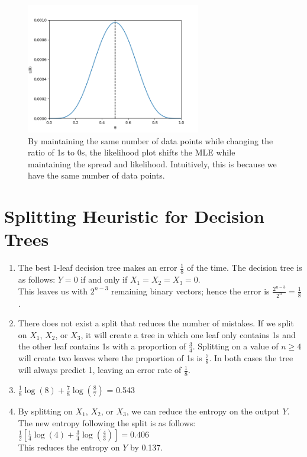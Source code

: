 \documentclass[11pt]{article}
\newcommand{\solution}[1]{{{\color{blue}{\bf Solution:} {#1}}}}
\begin{document}
\begin{enumerate}
{\begin{figure}[!htbp]
    \centering
    \includegraphics[width=3in]{1diii.png}
    \caption{By maintaining the same number of data points while changing the ratio of 1s to 0s, the likelihood plot shifts the MLE while maintaining the spread and likelihood. Intuitively, this is because we have the same number of data points.}
\end{figure}
}
\end{enumerate}
\newpage

\section{Splitting Heuristic for Decision Trees}
\begin{enumerate}
\item
\solution{The best 1-leaf decision tree makes an error $\frac{1}{8}$ of the time.  The decision tree is as follows: $Y = 0$ if and only if $X_1 = X_2 = X_3 = 0$. \\
This leaves us with $2^{n-3}$ remaining binary vectors; hence the error is $\frac{2^{n-3}}{2^n} = \frac{1}{8}$.
}
\vspace{1cm}

\item
\solution{There does not exist a split that reduces the number of mistakes. If we split on $X_1$, $X_2$, or $X_3$, it will create a tree in which one leaf only contains 1s and the other leaf contains 1s with a proportion of $\frac{3}{4}$. Splitting on a value of $n \geq 4$ will create two leaves where the proportion of 1s is $\frac{7}{8}$. In both cases the tree will always predict 1, leaving an error rate of $\frac{1}{8}$.
}
\vspace{1cm}

\item
\solution{$\frac{1}{8}\log(8) + \frac{7}{8}\log(\frac{8}{7})$ = 0.543
}
\vspace{1cm}

\item
\solution{By splitting on $X_1$, $X_2$, or $X_3$, we can reduce the entropy on the output $Y$. The new entropy following the split is as follows: \\
$\frac{1}{2}[\frac{1}{4}\log(4)+\frac{3}{4}\log(\frac{4}{3})]= 0.406$ \\
This reduces the entropy on $Y$ by 0.137.
}
\newpage
\end{enumerate}
\end{document}
